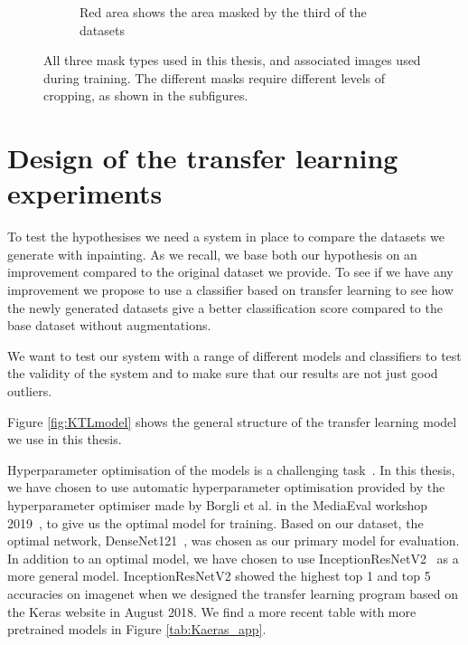 \begin{figure}[h]
\begin{subfigure}[t]{0.37\textwidth}
         \caption{Red area shows the area masked by the third of the datasets}
         \label{fig:BothMask}
     \end{subfigure}
     \caption{All three mask types used in this thesis, and associated images used during training. The different masks require different levels of cropping, as shown in the subfigures.}
     \label{fig:masks}
\end{figure}


\FloatBarrier
\section{Design of the transfer learning experiments}
\label{cha:classifier}
To test the hypothesises we need a system in place to compare the datasets we generate with inpainting. As we recall, we base both our hypothesis on an improvement compared to the original dataset we provide. 
To see if we have any improvement we propose to use a classifier based on transfer learning to see how the newly generated datasets give a better classification score compared to the base dataset without augmentations.

We want to test our system with a range of different models and classifiers to test the validity of the system and to make sure that our results are not just good outliers.

Figure \ref{fig:KTLmodel} shows the general structure of the transfer learning model we use in this thesis. 

Hyperparameter optimisation of the models is a challenging task~\cite{runeMedico2018}. In this thesis, we have chosen to use automatic hyperparameter optimisation provided by the hyperparameter optimiser made by Borgli et al. in the MediaEval workshop 2019~\cite{runeMedico2018}, to give us the optimal model for training. Based on our dataset, the optimal network, DenseNet121~\cite{DBLP:journals/corr/HuangLW16a}, was chosen as our primary model for evaluation. 
In addition to an optimal model, we have chosen to use InceptionResNetV2~\cite{DBLP:journals/corr/SzegedyIV16} as a more general model. InceptionResNetV2 showed the highest top 1 and top 5 accuracies on imagenet when we designed the transfer learning program based on the Keras website in August 2018. We find a more recent table with more pretrained models in Figure \ref{tab:Kaeras_app}.



